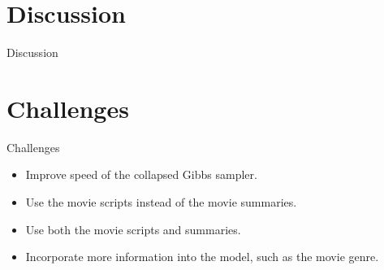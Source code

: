 \documentclass{beamer}
\begin{document}
\section{Discussion}

\begin{frame}{Discussion}
 
\end{frame}

\section{Challenges}

\begin{frame}{Challenges}
	\begin{itemize}
	\item Improve speed of the collapsed Gibbs sampler.
	\item Use the movie scripts instead of the movie summaries.
	\item Use both the movie scripts and summaries.
	\item Incorporate more information into the model, such as the movie genre.
	\end{itemize}
\end{frame}
\end{document}
